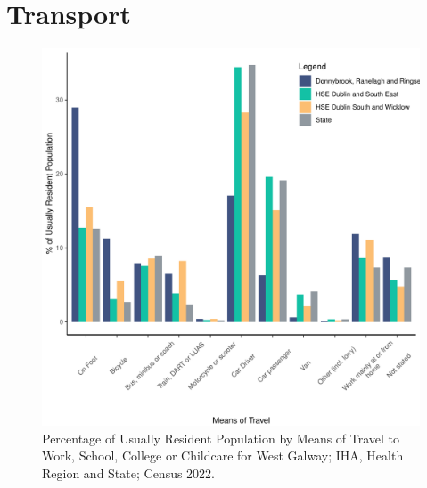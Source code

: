 \documentclass{article}
\begin{document}
\section{Transport}\label{sect:Trans}
\begin{figure}[H]
	\centering
	\includegraphics[width = 120mm]{../figures/TravelED.pdf}
	\caption{Percentage of Usually Resident Population by Means of Travel to Work, School, College or Childcare for West Galway; IHA, Health Region and State; Census 2022.}
	\label{fig:vbnv}
	\end{figure}
\end{document}
